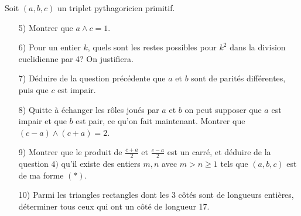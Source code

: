 \begin{td-exo}[]
\begin{enumerate}[1)]
		\begin{ga-subpart}
			Soit $(a, b, c)$ un triplet pythagoricien primitif.
			\begin{enumerate}[]
				\item[5)] Montrer que $a\wedge c=1$.
				
				\item[6)] Pour un entier $k$, quels sont les restes possibles pour $k^2$ dans la division euclidienne par
				4? On justifiera.
				
				\item[7)] Déduire de la question précédente que $a$ et $b$ sont de parités différentes, puis que $c$ est
				impair.
				
				\item[8)] Quitte à échanger les rôles joués par $a$ et $b$ on peut supposer que $a$ est impair et que $b$ est pair, ce qu'on fait maintenant. Montrer que $(c-a)\wedge(c+a)=2$.
				
				\item[9)] Montrer que le produit de $\frac{c+a}2$ et $\frac{c-a}2$ est un carré, et déduire de la question $4)$ qu'il existe des entiers $m, n$ avec $m>n\ge1$ tels que $(a,b,c)$ est de ma forme $(\ast)$.
				
				\item[10)] Parmi les triangles rectangles dont les 3 côtés sont de longueurs entières, déterminer tous ceux qui ont un côté de longueur 17.
			\end{enumerate}
		\end{ga-subpart}
		
	\end{enumerate}
	
\end{td-exo}